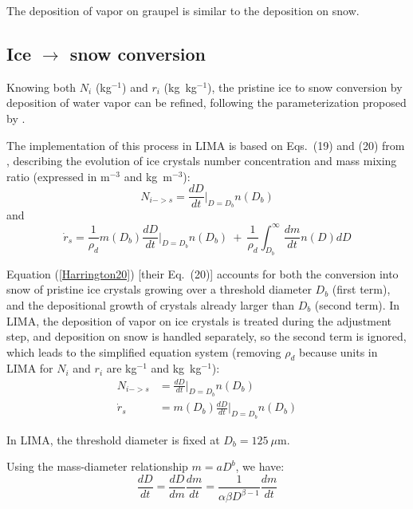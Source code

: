 The deposition of vapor on graupel is similar to the deposition on snow.

\subsection{Ice $\rightarrow$ snow conversion}

Knowing both $N_i$ (kg$^{-1}$) and $r_i$ (kg~kg$^{-1}$), the pristine ice to snow conversion by deposition of water vapor can be refined, following the parameterization proposed by \citet{Harrington1995}.

The implementation of this process in LIMA is based on Eqs.\ (19) and (20) from \citet{Harrington1995}, describing the evolution of ice crystals number concentration and mass mixing ratio (expressed in m$^{-3}$ and kg~m$^{-3}$):
\begin{equation}
\label{Harrington19}
 N_{i->s} = \frac{dD}{dt}\bigg|_{D=D_b}n(D_b)
\end{equation}
and
\begin{equation}
\label{Harrington20}
 \dot{r}_s = \frac{1}{\rho_d}m(D_b)\frac{dD}{dt}\bigg|_{D=D_b}n(D_b) ~ + ~ \frac{1}{\rho_d}\int^\infty_{D_b}\frac{dm}{dt}n(D)dD
\end{equation}

Equation (\ref{Harrington20}) [their Eq.\ (20)] accounts for both the conversion into snow of pristine ice crystals growing over a threshold diameter $D_b$ (first term), and the depositional growth of crystals already larger than $D_b$ (second term). In LIMA, the deposition of vapor on ice crystals is treated during the adjustment step, and deposition on snow is handled separately, so the second term is ignored, which leads to the simplified equation system (removing $\rho_d$ because units in LIMA for $N_i$ and $r_i$ are kg$^{-1}$ and kg~kg$^{-1}$):
\begin{align}
  N_{i->s} &= \frac{dD}{dt}\bigg|_{D=D_b}n(D_b) \\
 \dot{r}_s &= m(D_b)\frac{dD}{dt}\bigg|_{D=D_b}n(D_b)
\end{align}

In LIMA, the threshold diameter is fixed at $D_b = 125~\mu$m.

Using the mass-diameter relationship $m=a D^b$, we have:
\begin{equation}
 \frac{dD}{dt}=\frac{dD}{dm}\frac{dm}{dt}=\frac{1}{\alpha\beta D^{\beta -1}}\frac{dm}{dt}
\end{equation}

